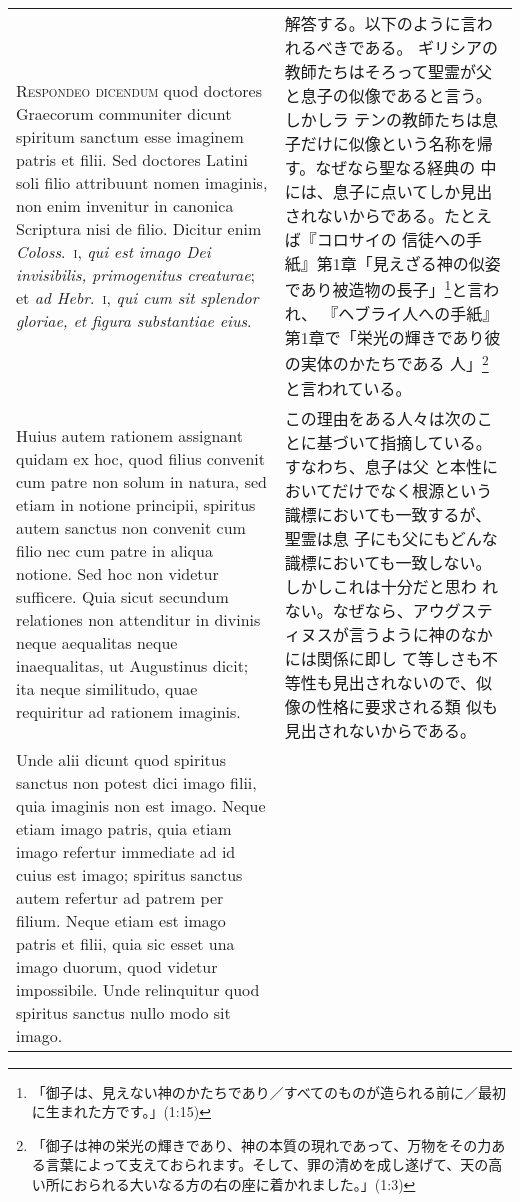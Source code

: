 \documentclass[10pt]{jsarticle} %
\begin{document}
\begin{longtable}{p{21em}p{21em}}
{\scshape Respondeo dicendum} quod doctores Graecorum communiter dicunt spiritum
sanctum esse imaginem patris et filii. Sed doctores Latini soli filio
attribuunt nomen imaginis, non enim invenitur in canonica Scriptura
nisi de filio. Dicitur enim {\itshape Coloss}.~{\scshape i}, {\itshape qui est imago Dei invisibilis,
primogenitus creaturae}; et {\itshape ad Hebr}.~{\scshape i}, {\itshape qui cum sit splendor gloriae,
et figura substantiae eius}. 


&

解答する。以下のように言われるべきである。
ギリシアの教師たちはそろって聖霊が父と息子の似像であると言う。しかしラ
 テンの教師たちは息子だけに似像という名称を帰す。なぜなら聖なる経典の
 中には、息子に点いてしか見出されないからである。たとえば『コロサイの
 信徒への手紙』第1章「見えざる神の似姿であり被造物の長子」\footnote{「御子は、見えない神のかたちであり／すべてのものが造られる前に／最初に生まれた方です。」(1:15)}と言われ、
 『ヘブライ人への手紙』第1章で「栄光の輝きであり彼の実体のかたちである
 人」\footnote{「御子は神の栄光の輝きであり、神の本質の現れであって、万物をその力ある言葉によって支えておられます。そして、罪の清めを成し遂げて、天の高い所におられる大いなる方の右の座に着かれました。」(1:3)}と言われている。

\\


Huius autem rationem assignant quidam ex
hoc, quod filius convenit cum patre non solum in natura, sed etiam in
notione principii, spiritus autem sanctus non convenit cum filio nec
cum patre in aliqua notione. Sed hoc non videtur sufficere. Quia sicut
secundum relationes non attenditur in divinis neque aequalitas neque
inaequalitas, ut Augustinus dicit; ita neque similitudo, quae
requiritur ad rationem imaginis. 


&

この理由をある人々は次のことに基づいて指摘している。すなわち、息子は父
 と本性においてだけでなく根源という識標においても一致するが、聖霊は息
 子にも父にもどんな識標においても一致しない。しかしこれは十分だと思わ
 れない。なぜなら、アウグスティヌスが言うように神のなかには関係に即し
 て等しさも不等性も見出されないので、似像の性格に要求される類
 似も見出されないからである。


\\

Unde alii dicunt quod spiritus
sanctus non potest dici imago filii, quia imaginis non est
imago. Neque etiam imago patris, quia etiam imago refertur immediate
ad id cuius est imago; spiritus sanctus autem refertur ad patrem per
filium. Neque etiam est imago patris et filii, quia sic esset una
imago duorum, quod videtur impossibile. Unde relinquitur quod spiritus
sanctus nullo modo sit imago.


\end{longtable}
\end{document}
